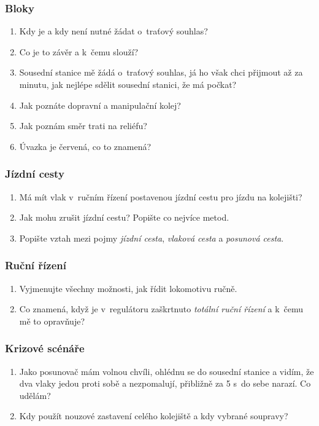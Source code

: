 \documentclass[12pt,a4paper]{article}
\begin{document}
\subsubsection*{Bloky}
\begin{enumerate}[leftmargin=*]
\item Kdy je a kdy není nutné žádat o~traťový souhlas?
\item Co je to závěr a k~čemu slouží?
\item Sousední stanice mě žádá o~traťový souhlas, já ho však chci přijmout až
za minutu, jak nejlépe sdělit sousední stanici, že má počkat?
\item Jak poznáte dopravní a manipulační kolej?
\item Jak poznám směr trati na reliéfu?
\item Úvazka je červená, co to znamená?
\end{enumerate}

\subsubsection*{Jízdní cesty}
\begin{enumerate}[leftmargin=*]
\item Má mít vlak v~ručním řízení postavenou jízdní cestu pro jízdu na
kolejišti?
\item Jak mohu zrušit jízdní cestu? Popište co nejvíce metod.
\item Popište vztah mezi pojmy \textit{jízdní cesta}, \textit{vlaková cesta} a
\textit{posunová cesta}.
\end{enumerate}

\subsubsection*{Ruční řízení}
\begin{enumerate}[leftmargin=*]
\item Vyjmenujte všechny možnosti, jak řídit lokomotivu ručně.
\item Co znamená, když je v~regulátoru zaškrtnuto \textit{totální ruční řízení}
a k~čemu mě to opravňuje?
\end{enumerate}

\subsubsection*{Krizové scénáře}
\begin{enumerate}[leftmargin=*]
\item Jako posunovač mám volnou chvíli, ohlédnu se do sousední stanice a vidím,
že dva vlaky jedou proti sobě a nezpomalují, přibližně za 5 s~do sebe narazí.
Co udělám?
\item Kdy použít nouzové zastavení celého kolejiště a kdy vybrané soupravy?
\end{enumerate}
\end{document}
